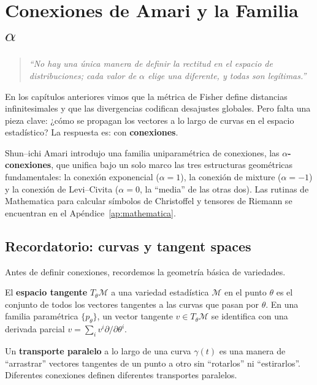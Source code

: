 
\chapter{Conexiones de Amari y la Familia $\alpha$}

\begin{quotation}
	\itshape
	``No hay una única manera de definir la rectitud en el espacio de distribuciones; cada valor de $\alpha$ elige una diferente, y todas son legítimas.''
\end{quotation}

En los capítulos anteriores vimos que la métrica de Fisher define distancias infinitesimales y que las divergencias codifican desajustes globales.  Pero falta una pieza clave: ¿cómo se propagan los vectores a lo largo de curvas en el espacio estadístico?  La respuesta es: con \textbf{conexiones}.

Shun--ichi Amari introdujo una familia uniparamétrica de conexiones, las \textbf{$\alpha$-conexiones}, que unifica bajo un solo marco las tres estructuras geométricas fundamentales: la conexión exponencial ($\alpha = 1$), la conexión de mixture ($\alpha = -1$) y la conexión de Levi--Civita ($\alpha = 0$, la ``media'' de las otras dos).  Las rutinas de Mathematica para calcular símbolos de Christoffel y tensores de Riemann se encuentran en el Apéndice~\ref{ap:mathematica}.

\section{Recordatorio: curvas y tangent spaces}

Antes de definir conexiones, recordemos la geometría básica de variedades.

\begin{definition}
	El \textbf{espacio tangente} $T_\theta \mathcal{M}$ a una variedad estadística $\mathcal{M}$ en el punto $\theta$ es el conjunto de todos los vectores tangentes a las curvas que pasan por $\theta$.  En una familia paramétrica $\{p_\theta\}$, un vector tangente $v \in T_\theta \mathcal{M}$ se identifica con una derivada parcial $v = \sum_i v^i \partial/\partial\theta^i$.
\end{definition}

\begin{definition}
	Un \textbf{transporte paralelo} a lo largo de una curva $\gamma(t)$ es una manera de ``arrastrar'' vectores tangentes de un punto a otro sin ``rotarlos'' ni ``estirarlos''.  Diferentes conexiones definen diferentes transportes paralelos.
\end{definition}

